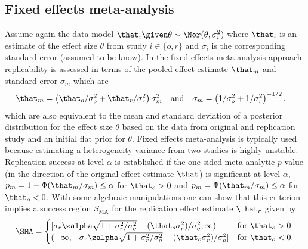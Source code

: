 \begin{subappendices}
\subsection{Fixed effects meta-analysis}
Assume again the data model
$\that_{i} \given \theta \sim \Nor(\theta, \sigma^{2}_{i})$ where $\that_{i}$ is
an estimate of the effect size $\theta$ from study $i \in \{o, r\}$ and
$\sigma_{i}$ is the corresponding standard error (assumed to be know). In the
fixed effects meta-analysis approach replicability is assessed in terms of the
pooled effect estimate $\that_{m}$ and standard error $\sigma_{m}$ which are
\begin{align*}
  &\that_{m} =
    \left(\that_{o}/\sigma_{o}^{2} + \that_{r}/\sigma^{2}_{r}\right)\sigma^{2}_{m}&
&\text{and}&                                                                                       &\sigma_{m} = \left(1/\sigma^{2}_{o} + 1/\sigma^{2}_{r}\right)^{-1/2},&
\end{align*}
which are also equivalent to the mean and standard deviation of a posterior
distribution for the effect size $\theta$ based on the data from original and
replication study and an initial flat prior for $\theta$. Fixed effects
meta-analysis is typically used because estimating a heterogeneity variance from
two studies is highly unstable. Replication success at level $\alpha$ is
established if the one-sided meta-analytic $p$-value (in the direction of the
original effect estimate $\that$) is significant at level $\alpha$, \ie{}
$p_{m} = 1 - \Phi(\that_{m}/\sigma_{m}) \leq \alpha$ for $\that_{o} > 0$ and
$p_{m} = \Phi(\that_{m}/\sigma_{m}) \leq \alpha$ for $\that_{o} < 0$.
With some algebraic manipulations one can show that this criterion implies a
success region $S_{\text{MA}}$ for the replication effect estimate $\that_{r}$
given by
\begin{align*}
  \SMA
  =
  \begin{cases}
    [\sigma_{r} \zalpha\sqrt{1 + \sigma^{2}_{r}/\sigma^{2}_{o}} -
      (\that_{o} \sigma^{2}_{r})/\sigma^{2}_{o},   \infty )
    & \text{for} ~ \that_{o} > 0 \\
    (-\infty, -\sigma_{r} \zalpha\sqrt{1 + \sigma^{2}_{r}/\sigma^{2}_{o}} -
      (\that_{o} \sigma^{2}_{r})/\sigma^{2}_{o}]
    & \text{for} ~ \that_{o} < 0.
\end{cases}
\end{align*}



\end{subappendices}
